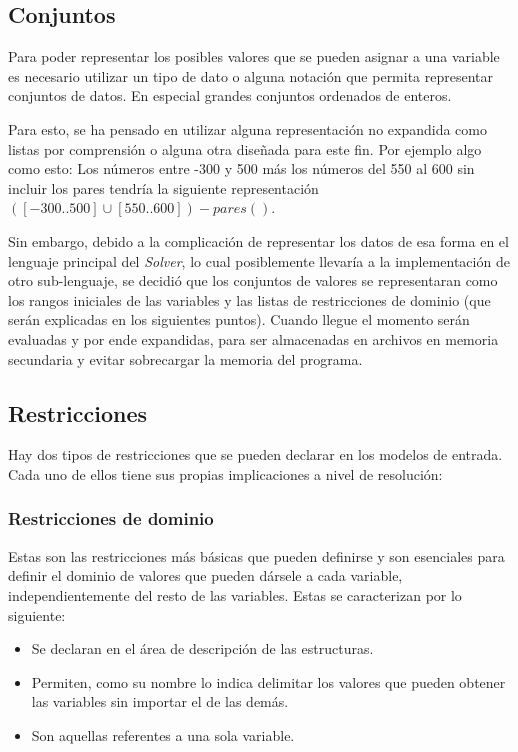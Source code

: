 \subsection{Conjuntos}
Para poder representar los posibles valores que se pueden asignar a una variable
es necesario utilizar un tipo de dato o alguna notación que permita representar
conjuntos de datos. En especial grandes conjuntos ordenados de enteros.

Para esto, se ha pensado en utilizar alguna representación no expandida como 
listas por comprensión o alguna otra diseñada para este fin. Por ejemplo algo como 
esto: Los números entre -300 y 500 más los números del 550 al 600 sin incluir los
pares tendría la siguiente representación $([-300 .. 500] \cup [550..600]) - pares()$.

Sin embargo, debido a la complicación de representar los datos de esa forma en el 
lenguaje principal del \emph{Solver}, lo cual posiblemente llevaría a la implementación de 
otro sub-lenguaje, se decidió que los conjuntos de valores se representaran como 
los rangos iniciales de las variables y las listas de restricciones de dominio 
(que serán explicadas en los siguientes puntos). Cuando llegue el momento serán 
evaluadas y por ende expandidas, para ser almacenadas en archivos en memoria 
secundaria y evitar sobrecargar la memoria del programa.

\subsection{Restricciones}
Hay dos tipos de restricciones que se pueden declarar en los modelos de entrada.
Cada uno de ellos tiene sus propias implicaciones a nivel de resolución:

\subsubsection{Restricciones de dominio}
Estas son las restricciones más básicas que pueden definirse y son esenciales 
para definir el dominio de valores que pueden dársele a cada variable, 
independientemente del resto de las variables. Estas se caracterizan por lo siguiente:
\begin{itemize}
 \item {Se declaran en el área de descripción de las estructuras.}
 \item {Permiten, como su nombre lo indica delimitar los valores que 
  pueden obtener las variables sin importar el de las demás.}
 \item {Son aquellas referentes a una sola variable.}
\end{itemize}

